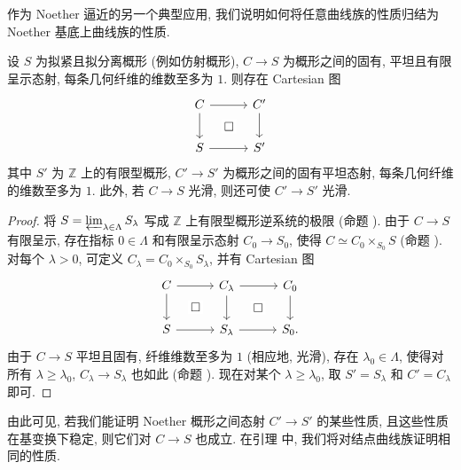 作为 Noether 逼近的另一个典型应用, 我们说明如何将任意曲线族的性质归结为 Noether 基底上曲线族的性质.
\begin{proposition}\label{src:B.3.9}
设 $S$ 为拟紧且拟分离概形 (例如仿射概形), $C\to S$ 为概形之间的固有, 平坦且有限呈示态射, 每条几何纤维的维数至多为 $1$. 则存在 Cartesian 图
\[
\begin{tikzcd}[column sep=3em,row sep=2em]
C\arrow[r]\arrow[d]\arrow[dr,phantom,"\square" description]&C'\arrow[d]\\
S\arrow[r]&S'
\end{tikzcd}
\]
其中 $S'$ 为 $\mathbb Z$ 上的有限型概形, $C'\to S'$ 为概形之间的固有平坦态射, 每条几何纤维的维数至多为 $1$. 此外, 若 $C\to S$ 光滑, 则还可使 $C'\to S'$ 光滑.
\end{proposition}
\begin{proof}
将 $S=\varprojlim_{\lambda\in\Lambda}S_\lambda$ 写成 $\mathbb Z$ 上有限型概形逆系统的极限 (命题 ). 由于 $C\to S$ 有限呈示, 存在指标 $0\in\Lambda$ 和有限呈示态射 $C_0\to S_0$, 使得 $C\simeq C_0\times_{S_0}S$ (命题 ). 对每个 $\lambda>0$, 可定义 $C_\lambda=C_0\times_{S_0}S_\lambda$, 并有 Cartesian 图
\[
\begin{tikzcd}[column sep=3em,row sep=2em]
C\arrow[r]\arrow[d]\arrow[dr,phantom,"\square" description]&C_\lambda\arrow[r]\arrow[d]\arrow[dr,phantom,"\square" description]&C_0\arrow[d]\\
S\arrow[r]&S_\lambda\arrow[r]&S_0.
\end{tikzcd}
\]
由于 $C\to S$ 平坦且固有, 纤维维数至多为 $1$ (相应地, 光滑), 存在 $\lambda_0\in\Lambda$, 使得对所有 $\lambda\geq\lambda_0$, $C_\lambda\to S_\lambda$ 也如此 (命题 ). 现在对某个 $\lambda\geq\lambda_0$, 取 $S'=S_\lambda$ 和 $C'=C_\lambda$ 即可.
\end{proof}
由此可见, 若我们能证明 Noether 概形之间态射 $C'\to S'$ 的某些性质, 且这些性质在基变换下稳定, 则它们对 $C\to S$ 也成立. 在引理  中, 我们将对结点曲线族证明相同的性质.
\par\clearpage
\endgroup
